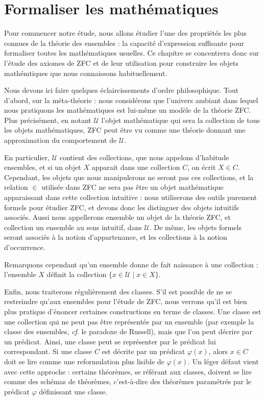 \chapter{Formaliser les mathématiques}

Pour commencer notre étude, nous allons étudier l'une des propriétés les plus
connues de la théorie des ensembles : la capacité d'expression suffisante pour
formaliser toutes les mathématiques usuelles. Ce chapitre se concentrera donc sur
l'étude des axiomes de ZFC et de leur utilisation pour construire les objets
mathémtiques que nous connaissons habituellement.

Nous devons ici faire quelques éclaircissements d'ordre philosophique. Tout
d'abord, sur la méta-théorie : nous considérons que l'univers ambiant dans lequel
nous pratiquons les mathématiques est lui-même un modèle de la théorie ZFC. Plus
précisément, en notant $\mathcal U$ l'objet mathématique qui sera la collection
de tous les objets mathématiques, ZFC peut être vu comme une théorie donnant une
approximation du comportement de $\mathcal U$.

En particulier, $\mathcal U$ contient des collections, que nous appelons
d'habitude ensembles, et si un objet $X$ apparait dans une collection $C$, on
écrit $X\in C$. Cependant, les objets que nous manipulerons ne seront pas ces
collections, et la relation $\in$ utilisée dans ZFC ne sera pas \og être un objet
mathématique apparaissant dans cette collection intuitive\fg{} : nous utiliserons
des outils purement formels pour étudier ZFC, et devons donc les distinguer des
objets intuitifs associés. Aussi nous appellerons \og ensemble\fg{} un objet de
la théorie ZFC, et \og collection\fg{} un ensemble au sens intuitif, dans
$\mathcal U$. De même, les objets formels seront associés à la notion
d'appartenance, et les collections à la notion d'occurrence.

Remarquons cependant qu'un ensemble donne de fait naissance à une
collection : l'ensemble $X$ définit la collection
$\{ x \in\mathcal U\mid x \in X \}$.

Enfin, nous traiterons régulièrement des classes. S'il est possible de ne se
restreindre qu'aux ensembles pour l'étude de ZFC, nous verrons qu'il est bien
plus pratique d'énoncer certaines constructions en terme de classes. Une classe
est une collection qui ne peut pas être représentée par un ensemble (par exemple
la classe des ensembles, \textit{cf}. le paradoxe de Russell), mais que l'on peut
décrire par un prédicat. Ainsi, une classe peut se représenter par le prédicat
lui correspondant. Si une classe $C$ est décrite par un prédicat $\varphi(x)$,
alors $x\in C$ doit se lire comme une reformulation plus lisible de $\varphi(x)$.
Un léger défaut vient avec cette approche : certains théorèmes, se référant aux
classes, doivent se lire comme des schémas de théorèmes, c'est-à-dire des
théorèmes paramétrés par le prédicat $\varphi$ définissant une classe.

